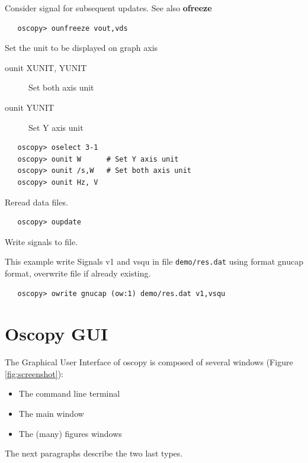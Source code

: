 \documentclass[a4paper,11pt]{article}
\begin{document}
   Consider signal for subsequent updates. See also \textbf{ofreeze}
\begin{verbatim}
   oscopy> ounfreeze vout,vds
\end{verbatim}

   Set the unit to be displayed on graph axis
   \begin{description}
   \item[ounit XUNIT, YUNIT] Set both axis unit
   \item[ounit YUNIT] Set Y axis unit
   \end{description}

\begin{verbatim}
   oscopy> oselect 3-1
   oscopy> ounit W      # Set Y axis unit
   oscopy> ounit /s,W   # Set both axis unit
   oscopy> ounit Hz, V
\end{verbatim}

   Reread data files.

\begin{verbatim}
   oscopy> oupdate
\end{verbatim}

   Write signals to file.

   This example write Signals v1 and vsqu in file \texttt{demo/res.dat} using format gnucap format, overwrite file if already existing.
\begin{verbatim}
   oscopy> owrite gnucap (ow:1) demo/res.dat v1,vsqu
\end{verbatim}
\newpage
\section{Oscopy GUI}
The Graphical User Interface of oscopy is composed of several windows (Figure \ref{fig:screenshot}):
\begin{itemize}
\item The command line terminal
\item The main window
\item The (many) figures windows
\end{itemize}
The next paragraphs describe the two last types.
\end{document}
